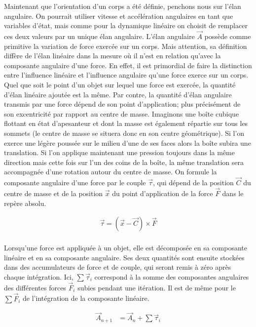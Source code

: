 Maintenant que l'orientation d'un corps a été définie, penchons nous
sur l'élan angulaire. On pourrait utiliser vitesse et accélération
angulaires en tant que variables d'état, mais comme pour la dynamique
linéaire on choisit de remplacer ces deux valeurs par un unique élan
angulaire. L'élan angulaire $\vec A$ possède comme primitive la
variation de force exercée sur un corps. Mais attention, sa définition
diffère de l'élan linéaire dans la mesure o\`u il n'est en relation
qu'avec la composante angulaire d'une force. En effet, il est
primordial de faire la distinction entre l'influence linéaire et
l'influence angulaire qu'une force exerce sur un corps. Quel que soit
le point d'un objet sur lequel une force est exercée, la quantité
d'élan linéaire ajoutée est la même. Par contre, la quantité d'élan
angulaire transmis par une force dépend de son point d'application;
plus précisément de son excentricité par rapport au centre de
masse. Imaginons une boîte cubique flottant en état d'apesanteur et
dont la masse est également répartie sur tous les sommets (le centre
de masse se situera donc en son centre géométrique). Si l'on exerce
une légère poussée sur le milieu d'une de ses faces alors la boîte
subira une translation. Si l'on applique maintenant une pression
toujours dans la même direction mais cette fois sur l'un des coins de
la boîte, la même translation sera accompagnée d'une rotation autour
du centre de masse. On formule la composante angulaire d'une force par
le couple $\vec{\tau}$, qui dépend de la position $\vec C$ du centre
de masse et de la position $\vec x$ du point d'application de la force
$\vec{F}$ dans le repère absolu.

\begin{align*}
  \vec{\tau} = (\vec{x} - \vec{C}) \times \vec{F} \\
\end{align*}

Lorsqu'une force est appliquée à un objet, elle est décomposée en sa
composante linéaire et en sa composante angulaire. Ses deux quantités
sont ensuite stockées dans des accumulateurs de force et de couple,
qui seront remis à zéro après chaque intégration. Ici, $\sum
\vec{\tau}_i$ correspond à la somme des composantes angulaires des
différentes forces $\vec{F}_i$ subies pendant une itération. Il est de
même pour le $\sum \vec{F}_i$ de l'intégration de la composante
linéaire.

\begin{align*}
  \vec{A}_{n+1} &= \vec{A}_n + {\sum \vec{\tau}_i} \\ \\
\end{align*}

